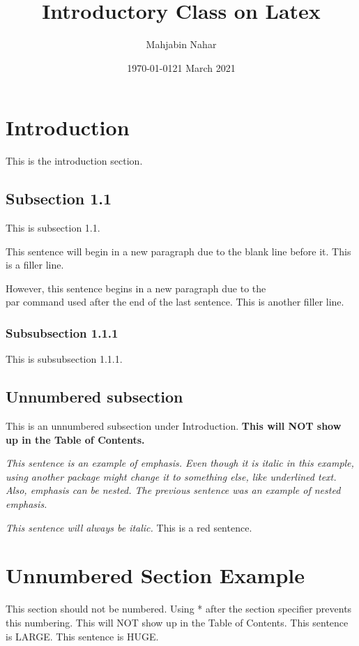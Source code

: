 \documentclass[14pt, a4paper]{article} %
\title{Introductory Class on Latex}
\author{Mahjabin Nahar}
\date{\today}
\date{21 March 2021}
\begin{document}
\maketitle
\tableofcontents %
\pagebreak %

\section{Introduction}
This is the introduction section.

\subsection{Subsection 1.1}
This is subsection 1.1.

This sentence will begin in a new paragraph due to the blank line before it. This is a filler line.\par
However, this sentence begins in a new paragraph due to the \\par command used after the end of the last sentence. This is another filler line.

\subsubsection{Subsubsection 1.1.1}
This is subsubsection 1.1.1.

\subsection*{Unnumbered subsection}
This is an unnumbered subsection under Introduction. \textbf{This will NOT show up in the Table of Contents.} 

\emph{This sentence is an example of emphasis. Even though it is italic in this example, using another package might change it to something else, like underlined text.  \emph{Also, emphasis can be nested.} The previous sentence was an example of nested emphasis.} 

\textit{This sentence will always be italic.}
{\color{red} This is a red sentence.} %


\section*{Unnumbered Section Example}
This section should not be numbered. Using * after the section specifier prevents this numbering. This will NOT show up in the Table of Contents.
\LARGE{This sentence is LARGE.}
\Huge{This sentence is HUGE.}
\end{document}
